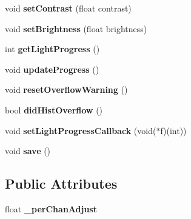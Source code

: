 \begin{DoxyCompactItemize}
\item 
void {\bfseries set\+Contrast} (float contrast)\hypertarget{classLightfieldCorrector_ae72105b1355293324bac10c60117a1e5}{}\label{classLightfieldCorrector_ae72105b1355293324bac10c60117a1e5}

\item 
void {\bfseries set\+Brightness} (float brightness)\hypertarget{classLightfieldCorrector_a9c5cac0108c1402ce23d2ed18210fc7f}{}\label{classLightfieldCorrector_a9c5cac0108c1402ce23d2ed18210fc7f}

\item 
int {\bfseries get\+Light\+Progress} ()\hypertarget{classLightfieldCorrector_a0871454067e61cd73c9963eb19124776}{}\label{classLightfieldCorrector_a0871454067e61cd73c9963eb19124776}

\item 
void {\bfseries update\+Progress} ()\hypertarget{classLightfieldCorrector_a146332f64b11dadfdf7ff66b9c6e9f61}{}\label{classLightfieldCorrector_a146332f64b11dadfdf7ff66b9c6e9f61}

\item 
void {\bfseries reset\+Overflow\+Warning} ()\hypertarget{classLightfieldCorrector_a58cda57140cd520d557dfe02cc22e1c6}{}\label{classLightfieldCorrector_a58cda57140cd520d557dfe02cc22e1c6}

\item 
bool {\bfseries did\+Hist\+Overflow} ()\hypertarget{classLightfieldCorrector_ad14fc305d597c8909f8e37b5b07ffbb0}{}\label{classLightfieldCorrector_ad14fc305d597c8909f8e37b5b07ffbb0}

\item 
void {\bfseries set\+Light\+Progress\+Callback} (void($\ast$f)(int))\hypertarget{classLightfieldCorrector_a1cf23d3cb70e754725a3060463a1b7d0}{}\label{classLightfieldCorrector_a1cf23d3cb70e754725a3060463a1b7d0}

\item 
void {\bfseries save} ()\hypertarget{classLightfieldCorrector_af65ee3f55a3a5f0813646c793a5c0d4f}{}\label{classLightfieldCorrector_af65ee3f55a3a5f0813646c793a5c0d4f}

\end{DoxyCompactItemize}
\subsection*{Public Attributes}
\begin{DoxyCompactItemize}
\item 
float {\bfseries \+\_\+per\+Chan\+Adjust}\hypertarget{classLightfieldCorrector_a06a4a68160d5a8530b337d0d9b395356}{}\label{classLightfieldCorrector_a06a4a68160d5a8530b337d0d9b395356}

\end{DoxyCompactItemize}
